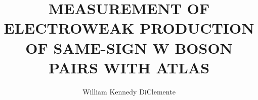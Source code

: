 
\title{MEASUREMENT OF ELECTROWEAK PRODUCTION OF SAME-SIGN W BOSON PAIRS WITH ATLAS}

\author{William Kennedy DiClemente}

\newcommand{\adviser}{I. Joseph Kroll, Professor, Physics}
\newcommand{\advisershort}{J. Kroll}

\newcommand{\myinstitution}{The University of Pennsylvania}

\newcommand{\chairperson}{Joshua Klein, Edmund J. and Louise W. Kahn Professor, Physics}

\newcommand{\committeeOne}{Elliot Lipeles, Associate Professor, Physics}
\newcommand{\committeeTwo}{Christopher Mauger, Associate Professor, Physics}
\newcommand{\committeeThree}{Burt Ovrut, Professor, Physics}
\newcommand{\committeeFour}{Justin Khoury, Professor, Physics}





